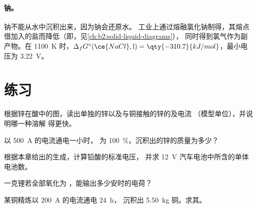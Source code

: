 \paragraph{钠。}钠不能从水中沉积出来，因为钠会还原水。
工业上通过熔融氯化钠制得，其熔点
借加入的盐而降低（即，见\cref{ch:b2:solid-liquid-diagrams}），
同时得到氯气作为副产物。在 \qty{1100}{K} 时，$\Delta_f G^\circ(\ce{NaCl}, \text{l}) =
\qty{-310.7}{kJ/mol}$，最小电压为 \qty{3.22}{V}。

\section{练习}

\begin{exercise}[$\star$]\label{exo:b2:batteries-electrolysis:1}
根据锌在酸中的图，读出单独的锌以及与铜接触的锌的及电流
（模型单位），并说明哪一种溶解
得更快。
\end{exercise}

\begin{exercise}[$\star$]\label{exo:b2:batteries-electrolysis:2}
以 \qty{500}{A} 的电流通电一小时，
为 100~\%，沉积出的锌的质量为多少？
\end{exercise}

\begin{exercise}[$\star$]\label{exo:b2:batteries-electrolysis:3}
根据本章给出的生成，计算铅酸的标准电压，
并求
\qty{12}{V} 汽车电池中所含的单体电池数。
\end{exercise}

\begin{exercise}[$\star$]\label{exo:b2:batteries-electrolysis:4}
一克锂若全部氧化为
，能输出多少安时的电荷？
\end{exercise}

\begin{exercise}[$\star\star$]\label{exo:b2:batteries-electrolysis:5}
某铜精炼以 \qty{200}{A} 的电流通电 \qty{24}{h}，
沉积出 \qty{5.50}{kg} 铜。求其。
\end{exercise}

